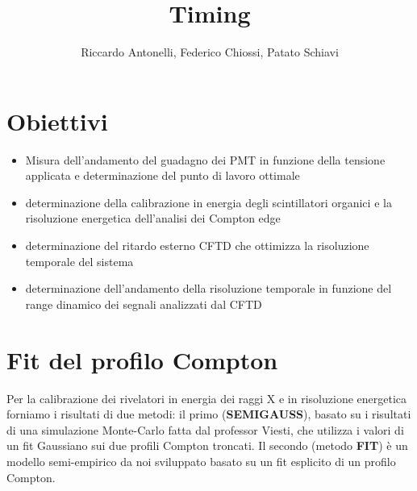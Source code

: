 \documentclass[a4paper,11pt,italian]{report}
\begin{document}
\author{Riccardo Antonelli, Federico Chiossi, Patato Schiavi}
\title{Timing}

\maketitle

\section{Obiettivi}


\begin{itemize}

\item Misura dell'andamento del guadagno dei PMT in funzione della tensione applicata e determinazione del punto di lavoro ottimale
\item determinazione della calibrazione in energia degli scintillatori organici e la risoluzione energetica dell'analisi dei Compton edge
\item determinazione del ritardo esterno CFTD che ottimizza la risoluzione temporale del sistema
\item determinazione dell'andamento della risoluzione temporale in funzione del range dinamico dei segnali analizzati dal CFTD

\end{itemize}

\section*{Fit del profilo Compton}

Per la calibrazione dei rivelatori in energia dei raggi X e in risoluzione energetica forniamo i risultati di due metodi: il primo (\textbf{SEMIGAUSS}), basato su i risultati di una simulazione Monte-Carlo fatta dal professor Viesti, che utilizza i valori di un fit Gaussiano sui due profili Compton troncati. Il secondo (metodo \textbf{FIT}) è un modello semi-empirico da noi sviluppato basato su un fit esplicito di un profilo Compton.\\
\end{document}
